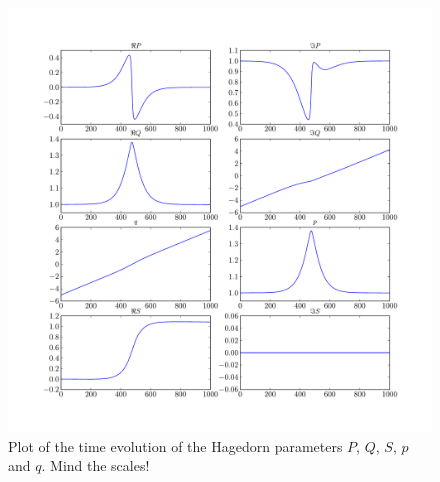 \begin{figure}
  \centering
  \includegraphics[width=\linewidth]{./plot/delta_gap/Parameters_h_dt0.01_eps0.1_d1.0e_p1/hagedorn_parameters.pdf}
  \caption{Plot of the time evolution of the Hagedorn parameters $P$, $Q$, $S$, $p$ and $q$. Mind the scales!}
  \label{fig:delta_gap_hagedorn_params_evolution}
\end{figure}


